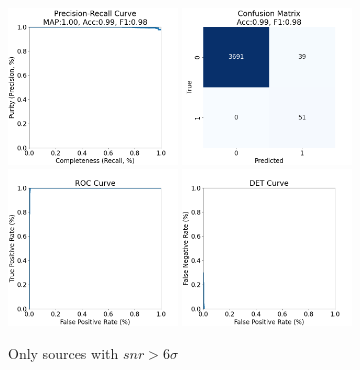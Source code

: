 \documentclass[DM,authoryear,toc]{lsstdoc}
\begin{document}
\begin{figure}[h]
  \centering
  \includegraphics[width=0.4\textwidth]{precrec_13-resnet50-FullAugmentation-scratch-B64__0255000__npy_data_0.1.2-6sigma_256by256__posw_20.png}
  \includegraphics[width=0.4\textwidth]{confmat_13-resnet50-FullAugmentation-scratch-B64__0255000__npy_data_0.1.2-6sigma_256by256__posw_20.png}
  \includegraphics[width=0.4\textwidth]{roc_13-resnet50-FullAugmentation-scratch-B64__0255000__npy_data_0.1.2-6sigma_256by256__posw_20.png}
  \includegraphics[width=0.4\textwidth]{det_13-resnet50-FullAugmentation-scratch-B64__0255000__npy_data_0.1.2-6sigma_256by256__posw_20.png}
  \caption{Only sources with $snr > 6\sigma$}
  \label{fig:tract_templates}
\end{figure}
\end{document}
